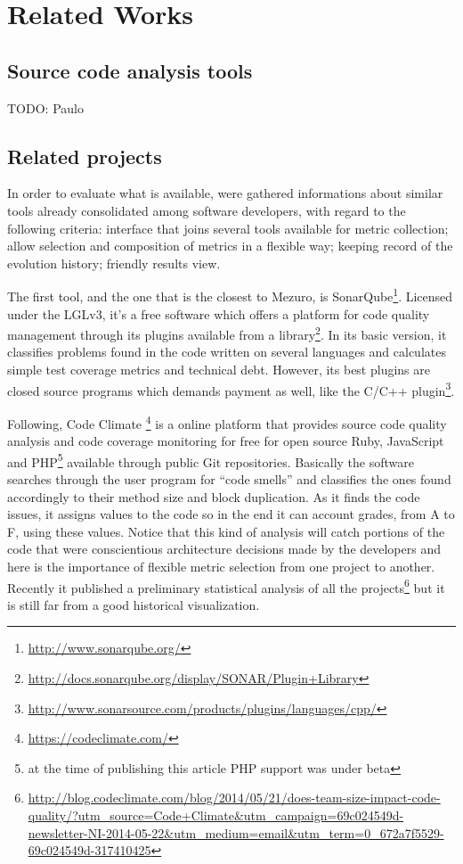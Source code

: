 \section{Related Works}
\label{sec:related_works}

\subsection{Source code analysis tools}
\label{subsec:related-tools}

TODO: Paulo

\subsection{Related projects}
\label{subsec:related-projects}

In order to evaluate what is available, were gathered informations about similar tools already consolidated among software developers, with regard to the following criteria: interface that joins several tools available for metric collection; allow selection and composition of metrics in a flexible way; keeping record of the evolution history; friendly results view.

The first tool, and the one that is the closest to Mezuro, is SonarQube\footnote{\url{http://www.sonarqube.org/}}. Licensed under the LGLv3, it's a free software which offers a platform for code quality management through its plugins available from a library\footnote{\url{http://docs.sonarqube.org/display/SONAR/Plugin+Library}}. In its basic version, it classifies problems found in the code written on several languages and calculates simple test coverage metrics and technical debt. However, its best plugins are closed source programs which demands payment as well, like the C/C++ plugin\footnote{\url{http://www.sonarsource.com/products/plugins/languages/cpp/}}.

Following, Code Climate \footnote{\url{https://codeclimate.com/}} is a online platform that provides source code quality analysis and code coverage monitoring for free for open source Ruby, JavaScript and PHP\footnote{at the time of publishing this article PHP support was under beta} available through public Git repositories. Basically the software searches through the user program for ``code smells'' and classifies the ones found accordingly to their method size and block duplication. As it finds the code issues, it assigns values to the code so in the end it can account grades, from A to F, using these values. Notice that this kind of analysis will catch portions of the code that were conscientious architecture decisions made by the developers and here is the importance of flexible metric selection from one project to another. Recently it published a preliminary statistical analysis of all the projects\footnote{\url{http://blog.codeclimate.com/blog/2014/05/21/does-team-size-impact-code-quality/?utm_source=Code+Climate&utm_campaign=69c024549d-newsletter-NI-2014-05-22&utm_medium=email&utm_term=0_672a7f5529-69c024549d-317410425}} but it is still far from a good historical visualization.

